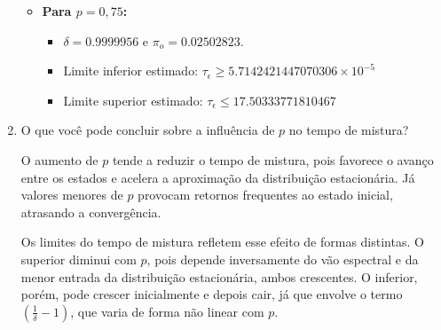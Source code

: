 \begin{enumerate}
\begin{resposta}
\begin{itemize}
            \item \textbf{Para $p = 0{,}75$:}
            \begin{itemize}
                \item $\delta = 0.9999956$ e $\pi_o = 0.02502823$.
                \item Limite inferior estimado:
                $ \boxed{\tau_\epsilon \geq 5.7142421447070306 \times 10^{-5}} $
                \item Limite superior estimado:
                $ \boxed{\tau_\epsilon \leq 17.50333771810467} $
            \end{itemize}
        \end{itemize}
    \end{resposta}

    \item O que você pode concluir sobre a influência de $p$ no tempo de mistura?
    \begin{resposta}
        O aumento de $p$ tende a reduzir o tempo de mistura, pois favorece o avanço entre os estados e acelera a aproximação da distribuição estacionária. Já valores menores de $p$ provocam retornos frequentes ao estado inicial, atrasando a convergência.

        Os limites do tempo de mistura refletem esse efeito de formas distintas. O superior diminui com $p$, pois depende inversamente do vão espectral e da menor entrada da distribuição estacionária, ambos crescentes. O inferior, porém, pode crescer inicialmente e depois cair, já que envolve o termo $\left( \frac{1}{\delta} - 1 \right)$, que varia de forma não linear com $p$.
    \end{resposta}
\end{enumerate}

